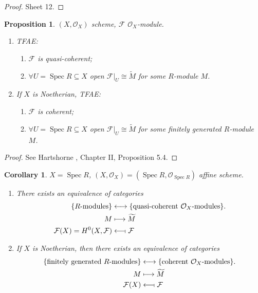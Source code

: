 \documentclass[12pt]{article}
\DeclareMathOperator{\Spec}{Spec}
\newtheorem*{proposition}{Proposition}
\newtheorem*{corollary}{Corollary}
\theoremstyle{definition}
\begin{document}
\begin{proof}
Sheet 12.
\end{proof}


\begin{proposition}
$(X,\mathcal O_X)$ scheme, $\mathcal F$ $\mathcal O_X$-module.

\begin{enumerate}[label=\roman*)]
\item TFAE:
\begin{enumerate}[label=\arabic*)]
\item $\mathcal F$ is quasi-coherent;
\item $\forall U=\Spec R\subseteq X$ open $\mathcal F|_U\cong\widetilde M$ for some $R$-module $M$.
\end{enumerate}

\item If $X$ is Noetherian, TFAE:
\begin{enumerate}[label=\arabic*)]
\item $\mathcal F$ is coherent;
\item $\forall U=\Spec R\subseteq X$ open $\mathcal F|_U\cong\widetilde M$ for some finitely generated $R$-module $M$.
\end{enumerate}
\end{enumerate}
\end{proposition}

\begin{proof}
See Hartshorne \cite{hartshorne2013algebraic}, Chapter II, Proposition 5.4.
\end{proof}

\begin{corollary}
$X=\Spec R$, $(X,\mathcal O_X)=(\Spec R,\mathcal O_{\Spec R})$ affine scheme.

\begin{enumerate}[label=\arabic*)]
\item There exists an equivalence of categories
\begin{align*}
\{R\text{-modules}\}&\longleftrightarrow\{\text{quasi-coherent }\mathcal O_X\text{-modules}\}.\\M&\longmapsto\widetilde M\\\mathcal F(X)=H^0(X,\mathcal F)&\longleftarrow\!\shortmid\mathcal F
\end{align*}

\item If $X$ is Noetherian, then there exists an equivalence of categories
\begin{align*}
\{\text{finitely generated }R\text{-modules}\}&\longleftrightarrow\{\text{coherent }\mathcal O_X\text{-modules}\}.\\M&\longmapsto\widetilde M\\\mathcal F(X)&\longleftarrow\!\shortmid\mathcal F
\end{align*}
\end{enumerate}
\end{corollary}
\end{document}
